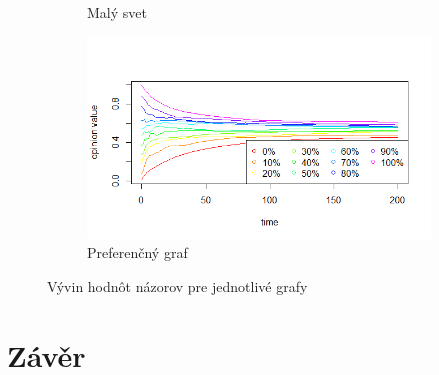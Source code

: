 \documentclass[10pt,a4paper]{report}
\begin{document}
\begin{figure}
\begin{subfigure}[b]{0.475\textwidth}
      \caption[]%
      {{\small Malý svet}}    
      \label{fig:prubeh-maly svet}
  \end{subfigure}
  \quad
  \begin{subfigure}[b]{0.475\textwidth}   
      \centering 
      \includegraphics[width=\textwidth]{plots/max-values/prefferentialMaxV.png}
      \caption[]%
      {{\small Preferenčný graf}}    
      \label{fig:prubeh-preferencni}
  \end{subfigure}
  \caption[ Vývin zmien pre jednotlivé grafy ]
  {\small Vývin hodnôt názorov pre jednotlivé grafy}
  \label{fig:prubeh-grafy}
\end{figure}
 
\chapter{Závěr}
\end{document}
